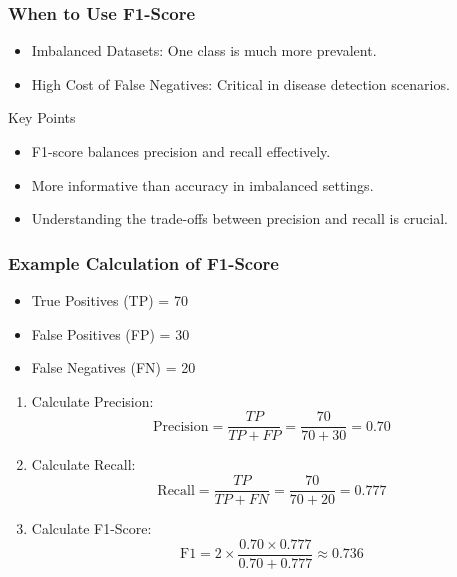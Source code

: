 \documentclass[aspectratio=169]{beamer}
\begin{document}
\begin{frame}[fragile]
    \frametitle{When to Use F1-Score}

    \begin{itemize}
        \item Imbalanced Datasets: One class is much more prevalent.
        \item High Cost of False Negatives: Critical in disease detection scenarios.
    \end{itemize}
    
    \begin{block}{Key Points}
        \begin{itemize}
            \item F1-score balances precision and recall effectively.
            \item More informative than accuracy in imbalanced settings.
            \item Understanding the trade-offs between precision and recall is crucial.
        \end{itemize}
    \end{block}
\end{frame}

\begin{frame}[fragile]
    \frametitle{Example Calculation of F1-Score}

    \begin{itemize}
        \item True Positives (TP) = 70
        \item False Positives (FP) = 30
        \item False Negatives (FN) = 20
    \end{itemize}

    \begin{enumerate}
        \item Calculate Precision:
        \[
        \text{Precision} = \frac{TP}{TP + FP} = \frac{70}{70 + 30} = 0.70
        \]
        
        \item Calculate Recall:
        \[
        \text{Recall} = \frac{TP}{TP + FN} = \frac{70}{70 + 20} = 0.777
        \]
        
        \item Calculate F1-Score:
        \[
        \text{F1} = 2 \times \frac{0.70 \times 0.777}{0.70 + 0.777} \approx 0.736
        \]
    \end{enumerate}
\end{frame}
\end{document}
